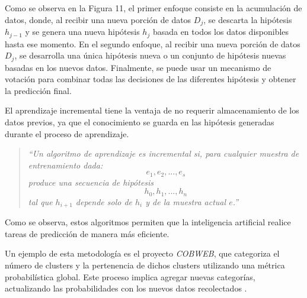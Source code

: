             Como se observa en la Figura 11, el primer enfoque consiste en la acumulación de datos, donde, al recibir una nueva porción de datos \(D_j\), se descarta la hipótesis \(h_{j-1}\) y se genera una nueva hipótesis \(h_j\) basada en todos los datos disponibles hasta ese momento. En el segundo enfoque, al recibir una nueva porción de datos \(D_j\), se desarrolla una única hipótesis nueva o un conjunto de hipótesis nuevas basadas en los nuevos datos. Finalmente, se puede usar un mecanismo de votación para combinar todas las decisiones de las diferentes hipótesis y obtener la predicción final.

            El aprendizaje incremental tiene la ventaja de no requerir almacenamiento de los datos previos, ya que el conocimiento se guarda en las hipótesis generadas durante el proceso de aprendizaje.

            \begin{quote}
                \textit{``Un algoritmo de aprendizaje es incremental si, para cualquier muestra de entrenamiento dada:
                \begin{equation*}
                    e_1, e_2, ..., e_s
                \end{equation*}
                produce una secuencia de hipótesis
                \begin{equation*}
                    h_0, h_1, ..., h_n
                \end{equation*}
                tal que \(h_{i+1}\) depende solo de \(h_i\) y de la muestra actual \(e\)\cite{GiraudCarrier2000}.''}
            \end{quote}

            Como se observa, estos algoritmos permiten que la inteligencia artificial realice tareas de predicción de manera más eficiente.

            Un ejemplo de esta metodología es el proyecto \textit{COBWEB}, que categoriza el número de clusters y la pertenencia de dichos clusters utilizando una métrica probabilística global. Este proceso implica agregar nuevas categorías, actualizando las probabilidades con los nuevos datos recolectados \cite{fisher1987}.